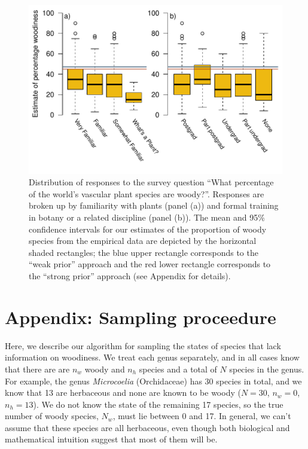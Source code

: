 \documentclass[12pt]{article}
\begin{document}
\begin{figure}[p]
  \centering
  \includegraphics{figs/survey-results}
  \caption{Distribution of responses to the survey question ``What
    percentage of the world's vascular plant species are
    woody?''. Responses are broken up by familiarity with plants
    (panel (a)) and formal training in botany or a related discipline
    (panel (b)). The mean and 95\% confidence intervals for our
    estimates of the proportion of woody species from the empirical
    data are depicted by the horizontal shaded rectangles; the blue
    upper rectangle corresponds to the ``weak prior'' approach and the
    red lower rectangle corresponds to the ``strong prior'' approach
    (see Appendix for details).}
  \label{fig:survey}
\end{figure}

\clearpage
\renewcommand\thefigure{S.\arabic{figure}}
\appendix
\section{Appendix: Sampling proceedure}
\setcounter{figure}{0}    

Here, we describe our algorithm for sampling the states of species
that lack information on woodiness. We treat each genus separately,
and in all cases know that there are are $n_w$ woody and $n_h$ species
and a total of $N$ species in the genus.
%
For example, the genus \textit{Microcoelia} (Orchidaceae) has 30
species in total, and we know that 13 are herbaceous and none are
known to be woody ($N = 30$, $n_w = 0$, $n_h = 13$). We do not know
the state of the remaining 17 species, so the true number of woody
species, $N_w$, must lie between 0 and 17. In general, we can't
assume that these species are all herbaceous, even though both
biological and mathematical intuition suggest that most of them will
be.
\end{document}

